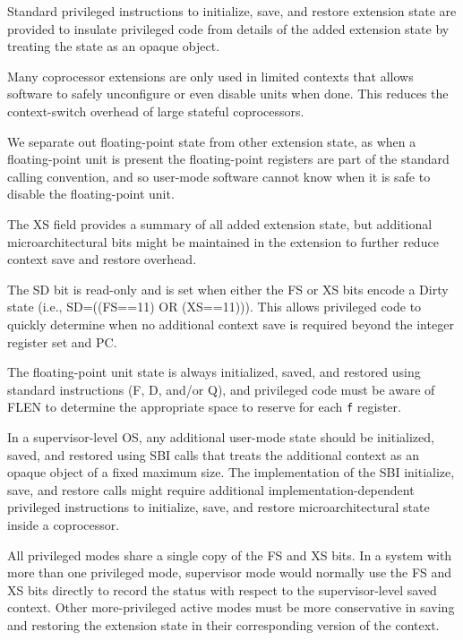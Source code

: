 Standard privileged instructions to initialize, save, and restore
extension state are provided to insulate privileged code from details
of the added extension state by treating the state as an opaque
object.

\begin{commentary}
Many coprocessor extensions are only used in limited contexts that
allows software to safely unconfigure or even disable units when done.
This reduces the context-switch overhead of large stateful
coprocessors.

We separate out floating-point state from other extension state, as
when a floating-point unit is present the floating-point registers are
part of the standard calling convention, and so user-mode software
cannot know when it is safe to disable the floating-point unit.
\end{commentary}

The XS field provides a summary of all added extension state, but
additional microarchitectural bits might be maintained in the
extension to further reduce context save and restore overhead.

The SD bit is read-only and is set when either the FS or XS bits
encode a Dirty state (i.e., SD=((FS==11) OR (XS==11))).  This allows
privileged code to quickly determine when no additional context save is
required beyond the integer register set and PC.

The floating-point unit state is always initialized, saved, and
restored using standard instructions (F, D, and/or Q), and privileged
code must be aware of FLEN to determine the appropriate space to
reserve for each {\tt f} register.

In a supervisor-level OS, any additional user-mode state should be
initialized, saved, and restored using SBI calls that treats the
additional context as an opaque object of a fixed maximum size.  The
implementation of the SBI initialize, save, and restore calls might
require additional implementation-dependent privileged instructions to
initialize, save, and restore microarchitectural state inside a
coprocessor.

All privileged modes share a single copy of the FS and XS bits.  In a
system with more than one privileged mode, supervisor mode would
normally use the FS and XS bits directly to record the status with
respect to the supervisor-level saved context.  Other more-privileged
active modes must be more conservative in saving and restoring the
extension state in their corresponding version of the context.

